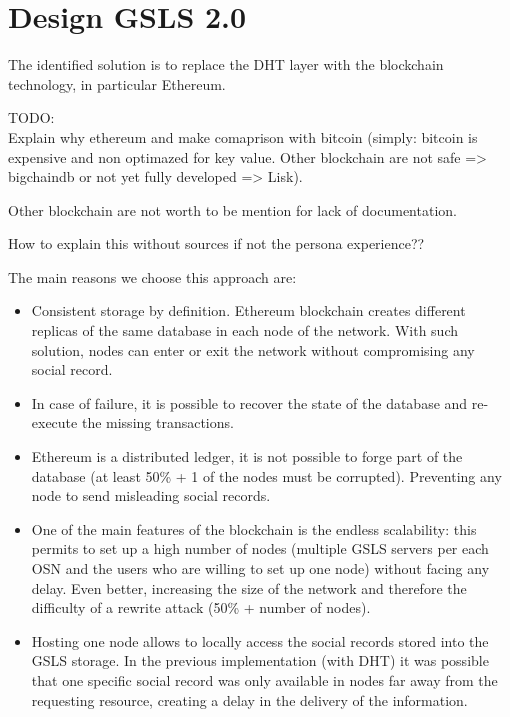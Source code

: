 
\section{Design GSLS 2.0}

The identified solution is to replace the DHT layer with the blockchain technology, in particular Ethereum.

\begin{notation}
  TODO: \\
  Explain why ethereum and make comaprison with bitcoin (simply: bitcoin is expensive and non optimazed for key value. Other blockchain are not safe => bigchaindb or not yet fully developed => Lisk).

  Other blockchain are not worth to be mention for lack of documentation.

  How to explain this without sources if not the persona experience??
\end{notation}
The main reasons we choose this approach are:

\begin{itemize}
  \item Consistent storage by definition. Ethereum blockchain creates different replicas of the same database in each node of the network. With such solution, nodes can enter or exit the network without compromising any social record.
  \item In case of failure, it is possible to recover the state of the database and re-execute the missing transactions.
  \item Ethereum is a distributed ledger, it is not possible to forge part of the database (at least 50\% + 1 of the nodes must be corrupted). Preventing any node to send misleading social records.
  \item One of the main features of the blockchain is the endless scalability: this permits to set up a high number of nodes (multiple GSLS servers per each OSN and the users who are willing to set up one node) without facing any delay.
  Even better, increasing the size of the network and therefore the difficulty of a rewrite attack (50\% + number of nodes).
  \item Hosting one node allows to locally access the social records stored into the GSLS storage. In the previous implementation (with DHT) it was possible that one specific social record was only available in nodes far away from the requesting resource, creating a delay in the delivery of the information. 
\end{itemize}

